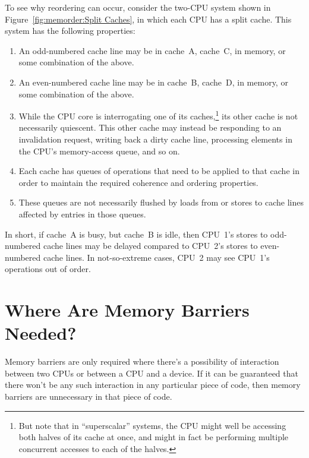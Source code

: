 To see why reordering can occur, consider the two-CPU system shown in
Figure~\ref{fig:memorder:Split Caches}, in which each CPU has a split
cache.
This system has the following properties:
\begin{enumerate}
\item	An odd-numbered cache line may be in cache~A, cache~C,
	in memory, or some combination of the above.
\item	An even-numbered cache line may be in cache~B, cache~D,
	in memory, or some combination of the above.
\item	While the CPU core is interrogating one of its caches,\footnote{
		But note that in ``superscalar'' systems, the CPU
		might well be accessing both halves of its cache at
		once, and might in fact be performing multiple concurrent
		accesses to each of the halves.}
	its other cache is not necessarily quiescent.
	This other cache may instead be responding to an invalidation
	request, writing back a dirty cache line,
	processing elements in the CPU's memory-access queue, and
	so on.
\item	Each cache has queues of operations that need to be applied
	to that cache in order to maintain the required coherence
	and ordering properties.
\item	These queues are not necessarily flushed by loads from or
	stores to cache lines affected by entries in those queues.
\end{enumerate}

In short, if cache~A is busy, but cache~B is idle, then CPU~1's
stores to odd-numbered cache lines may be delayed compared to
CPU~2's stores to even-numbered cache lines.
In not-so-extreme cases, CPU~2 may see CPU~1's operations out
of order.

	 {}

\section{Where Are Memory Barriers Needed?}
\label{sec:memorder:Where Are Memory Barriers Needed?}

Memory barriers are only required where there's a possibility of interaction
between two CPUs or between a CPU and a device.  If it can be guaranteed that
there won't be any such interaction in any particular piece of code, then
memory barriers are unnecessary in that piece of code.

